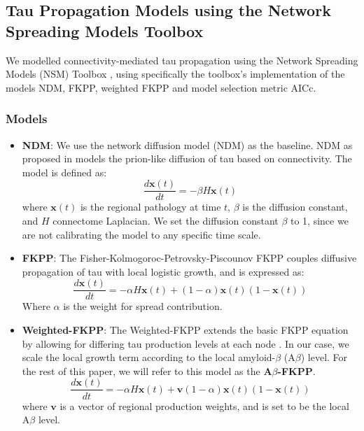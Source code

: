 \subsection{Tau Propagation Models using the Network Spreading Models Toolbox}
We modelled connectivity-mediated tau propagation using the Network Spreading Models (NSM) Toolbox \citep{thompsonDemonstrationOpensourceToolbox2024}, using specifically the toolbox's implementation of the models NDM, FKPP, weighted FKPP and model selection metric AICc.

\subsubsection{Models}
\begin{itemize}
    \item \textbf{NDM}:
    We use the network diffusion model (NDM) as the baseline. NDM as proposed in \citet{rajNetworkDiffusionModel2012} models the prion-like diffusion of tau based on connectivity. The model is defined as:
    $$
        \frac{d\mathbf{x}(t)}{dt} = -\beta H \mathbf{x}(t)
    $$
    where $\mathbf{x}(t)$ is the regional pathology at time $t$, $\beta$ is the diffusion constant, and $H$ connectome Laplacian. We set the diffusion constant $\beta$ to 1, since we are not calibrating the model to any specific time scale.

    \item \textbf{FKPP}:
    The Fisher-Kolmogoroc-Petrovsky-Piscounov FKPP \citep{weickenmeierPhysicsbasedModelExplains2019} couples diffusive propagation of tau with local logistic growth, and is expressed as:
    $$
    \frac{d\mathbf{x}(t)}{dt}
    =
    -\alpha H \mathbf{x}(t)
    +
    (1-\alpha)\mathbf{x}(t)(1-\mathbf{x}(t))
    $$
    Where $\alpha$ is the weight for spread contribution.

    \item \textbf{Weighted-FKPP}\label{section:WeightedFKPP}: 
    The Weighted-FKPP extends the basic FKPP equation by allowing for differing tau production levels at each node \citep{heCoupledmechanismsModellingFramework2023}. In our case, we scale the local growth term according to the local amyloid-$\beta$ (A$\beta$) level. For the rest of this paper, we will refer to this model as the \textbf{A$\beta$-FKPP}.
    $$
    \frac{d\mathbf{x}(t)}{dt}
    =
    -\alpha H \mathbf{x}(t)
    +
    \mathbf{v}(1-\alpha)\mathbf{x}(t)(1-\mathbf{x}(t))
    $$
    where $\mathbf{v}$ is a vector of regional production weights, and is set to be the local A$\beta$ level.
\end{itemize}


